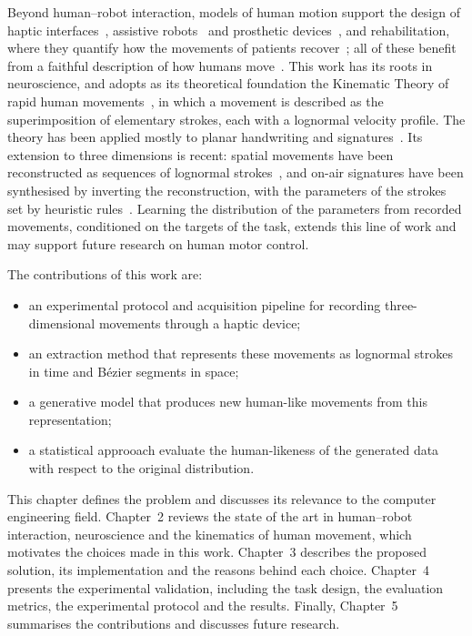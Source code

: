 \documentclass[12pt]{report}
\begin{document}
Beyond human--robot interaction, models of human motion support the design of haptic interfaces~\cite{bluteau2008}, assistive robots~\cite{losey2018} and prosthetic devices~\cite{merad2018}, and rehabilitation, where they quantify how the movements of patients recover~\cite{rohrer2002}; all of these benefit from a faithful description of how humans move~\cite{burdet2013}.
This work has its roots in neuroscience, and adopts as its theoretical foundation the Kinematic Theory of rapid human movements~\cite{plamondon1995a,plamondon1995b}, in which a movement is described as the superimposition of elementary strokes, each with a lognormal velocity profile. The theory has been applied mostly to planar handwriting and signatures~\cite{oreilly2009,diaz2019perspective}. Its extension to three dimensions is recent: spatial movements have been reconstructed as sequences of lognormal strokes~\cite{schindler2018,idelog3d}, and on-air signatures have been synthesised by inverting the reconstruction, with the parameters of the strokes set by heuristic rules~\cite{ferrer2023onair}. Learning the distribution of the parameters from recorded movements, conditioned on the targets of the task, extends this line of work and may support future research on human motor control.

The contributions of this work are:
\begin{itemize}
  \item an experimental protocol and acquisition pipeline for recording three-dimensional movements through a haptic device;
  \item an extraction method that represents these movements as lognormal strokes in time and Bézier segments in space;
  \item a generative model that produces new human-like movements from this representation;
  \item a statistical approoach evaluate the human-likeness of the generated data with respect to the original distribution.
\end{itemize}

This chapter defines the problem and discusses its relevance to the computer engineering field. Chapter~2 reviews the state of the art in human--robot interaction, neuroscience and the kinematics of human movement, which motivates the choices made in this work. Chapter~3 describes the proposed solution, its implementation and the reasons behind each choice. Chapter~4 presents the experimental validation, including the task design, the evaluation metrics, the experimental protocol and the results. Finally, Chapter~5 summarises the contributions and discusses future research.
\end{document}
